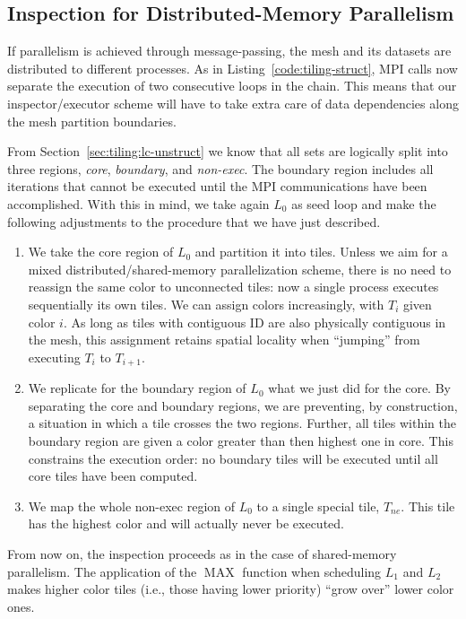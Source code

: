 \subsection*{Inspection for Distributed-Memory Parallelism}
If parallelism is achieved through message-passing, the mesh and its datasets are distributed to different processes. As in Listing~\ref{code:tiling-struct}, MPI calls now separate the execution of two consecutive loops in the chain. This means that our inspector/executor scheme will have to take extra care of data dependencies along the mesh partition boundaries.

From Section~\ref{sec:tiling:lc-unstruct} we know that all sets are logically split into three regions, \textit{core}, \textit{boundary}, and \textit{non-exec}. The boundary region includes all iterations that cannot be executed until the MPI communications have been accomplished. With this in mind, we take again $L_0$ as seed loop and make the following adjustments to the procedure that we have just described.
\begin{enumerate}
\item We take the core region of $L_0$ and partition it into tiles. Unless we aim for a mixed distributed/shared-memory parallelization scheme, there is no need to reassign the same color to unconnected tiles: now a single process executes sequentially its own tiles. We can assign colors increasingly, with $T_i$ given color $i$. As long as tiles with contiguous ID are also physically contiguous in the mesh, this assignment retains spatial locality when ``jumping'' from executing $T_i$ to $T_{i+1}$.
\item We replicate for the boundary region of $L_0$ what we just did for the core. By separating the core and boundary regions, we are preventing, by construction, a situation in which a tile crosses the two regions. Further, all tiles within the boundary region are given a color greater than then highest one in core. This constrains the execution order: no boundary tiles will be executed until all core tiles have been computed.
\item We map the whole non-exec region of $L_0$ to a single special tile, $T_{ne}$. This tile has the highest color and will actually never be executed. 
\end{enumerate}

From now on, the inspection proceeds as in the case of shared-memory parallelism. The application of the $\operatorname{MAX}$ function when scheduling $L_1$ and $L_2$ makes higher color tiles (i.e., those having lower priority) ``grow over'' lower color ones. 

